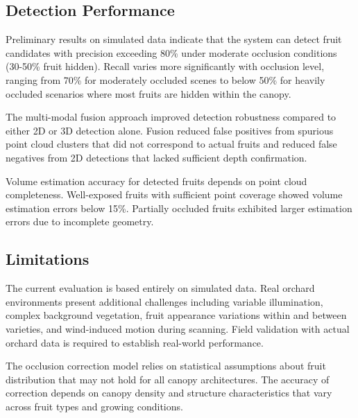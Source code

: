 \subsection{Detection Performance}
Preliminary results on simulated data indicate that the system can detect fruit candidates with precision exceeding 80\% under moderate occlusion conditions (30-50\% fruit hidden). Recall varies more significantly with occlusion level, ranging from 70\% for moderately occluded scenes to below 50\% for heavily occluded scenarios where most fruits are hidden within the canopy.

The multi-modal fusion approach improved detection robustness compared to either 2D or 3D detection alone. Fusion reduced false positives from spurious point cloud clusters that did not correspond to actual fruits and reduced false negatives from 2D detections that lacked sufficient depth confirmation.

Volume estimation accuracy for detected fruits depends on point cloud completeness. Well-exposed fruits with sufficient point coverage showed volume estimation errors below 15\%. Partially occluded fruits exhibited larger estimation errors due to incomplete geometry.

\subsection{Limitations}
The current evaluation is based entirely on simulated data. Real orchard environments present additional challenges including variable illumination, complex background vegetation, fruit appearance variations within and between varieties, and wind-induced motion during scanning. Field validation with actual orchard data is required to establish real-world performance.

The occlusion correction model relies on statistical assumptions about fruit distribution that may not hold for all canopy architectures. The accuracy of correction depends on canopy density and structure characteristics that vary across fruit types and growing conditions.